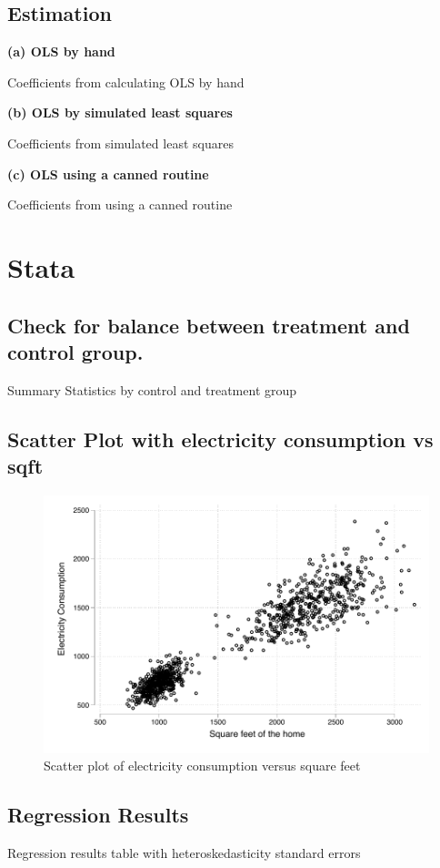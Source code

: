\documentclass{article}
\begin{document}
\subsection{Estimation}

\textbf{(a) OLS by hand}
\begin{table}[ht]
	\centering
	
	\caption{Coefficients from calculating OLS by hand }
\end{table}

\textbf{(b) OLS by simulated least squares}
\begin{table}[ht]
	\centering
	
	\caption{Coefficients from simulated least squares}
\end{table}


\textbf{(c) OLS using a canned routine}
\begin{table}[ht]
	\centering
	
	\caption{Coefficients from using a canned routine}
\end{table}


\section{Stata}

\subsection{Check for balance between treatment and control group.}

\begin{table}[H]
	\centering
	
	\caption{Summary Statistics by control and treatment group}
\end{table}


\subsection{Scatter Plot with electricity consumption vs sqft}
\begin{figure}[ht]
	\centering
	\includegraphics[scale = 0.7]{scatterplot.pdf}
	\caption{Scatter plot of electricity consumption versus square feet}
	\label{fig:scatterplot}
\end{figure}



\subsection{Regression Results}
\begin{table}[H]
\centering
	
	\caption{Regression results table with heteroskedasticity standard errors}
\end{table}
\end{document}
